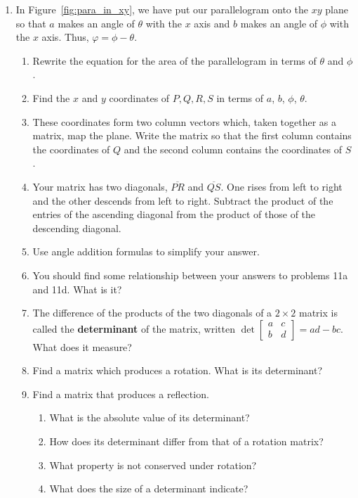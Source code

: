 \documentclass[../gatm_answers.tex]{subfiles}
\begin{document}
\begin{enumerate}
\setcounter{enumi}{\value{problem_i}}
\item In Figure~\ref{fig:para_in_xy}, we have put our parallelogram onto the $xy$ plane so that $a$ makes an angle of $\theta$ with the $x$ axis and $b$ makes an angle of $\phi$ with the $x$ axis. Thus, $\varphi=\phi-\theta$.
\begin{enumerate}
\item Rewrite the equation for the area of the parallelogram in terms of $\theta$ and $\phi$.
\item Find the $x$ and $y$ coordinates of $P,Q,R,S$ in terms of $a$, $b$, $\phi$, $\theta$.
\item These coordinates form two column vectors which, taken together as a matrix, map the plane. Write the matrix so that the first column contains the coordinates of $Q$ and the second column contains the coordinates of $S$.
\item Your matrix has two diagonals, $\overline{PR}$ and $\overline{QS}$. One rises from left to right and the other descends from left to right. Subtract the product of the entries of the ascending diagonal from the product of those of the descending diagonal.
\item Use angle addition formulas to simplify your answer.
\item You should find some relationship between your answers to problems 11a and 11d. What is it?
\item The difference of the products of the two diagonals of a $2\times 2$ matrix is called the \textbf{determinant} of the matrix, written $\det \left[\begin{smallmatrix}a & c \\ b & d \end{smallmatrix}\right]=ad-bc$. What does it measure?
\item Find a matrix which produces a rotation. What is its determinant?
\item Find a matrix that produces a reflection.
\begin{enumerate}
\item What is the absolute value of its determinant?
\item How does its determinant differ from that of a rotation matrix?
\item What property is not conserved under rotation?
\item What does the size of a determinant indicate?
\end{enumerate}
\end{enumerate}

\end{enumerate}
\end{document}
